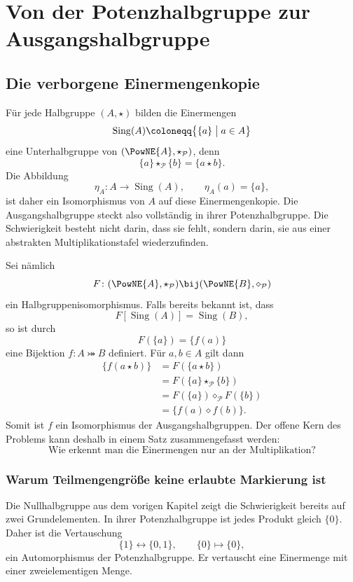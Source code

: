 \documentclass[main.tex]{subfiles}
\begin{document}
\chapter{Von der Potenzhalbgruppe zur Ausgangshalbgruppe}

\section{Die verborgene Einermengenkopie}

Für jede Halbgruppe \((A,\star)\) bilden die Einermengen
\[
  \operatorname{Sing}(A)
  \coloneqq
  \bigl\{\{a\}\bigm|a\in A\bigr\}
\]
eine Unterhalbgruppe von \((\PowNE{A},\star_{\mathcal P})\), denn
\[
  \{a\}\star_{\mathcal P}\{b\}=\{a\star b\}.
\]
Die Abbildung
\[
  \eta_A\colon A\to\operatorname{Sing}(A),
  \qquad
  \eta_A(a)=\{a\},
\]
ist daher ein Isomorphismus von \(A\) auf diese Einermengenkopie.  Die
Ausgangshalbgruppe steckt also vollständig in ihrer Potenzhalbgruppe.  Die
Schwierigkeit besteht nicht darin, dass sie fehlt, sondern darin, sie aus
einer abstrakten Multiplikationstafel wiederzufinden.

Sei nämlich
\[
  F\colon
  (\PowNE{A},\star_{\mathcal P})
  \bij
  (\PowNE{B},\diamond_{\mathcal P})
\]
ein Halbgruppenisomorphismus.  Falls bereits bekannt ist, dass
\[
  F[\operatorname{Sing}(A)]=\operatorname{Sing}(B),
\]
so ist durch
\[
  F(\{a\})=\{f(a)\}
\]
eine Bijektion \(f\colon A\bij B\) definiert.  Für \(a,b\in A\) gilt dann
\[
\begin{aligned}
  \{f(a\star b)\}
  &=F(\{a\star b\})\\
  &=F(\{a\}\star_{\mathcal P}\{b\})\\
  &=F(\{a\})\diamond_{\mathcal P}F(\{b\})\\
  &=\{f(a)\diamond f(b)\}.
\end{aligned}
\]
Somit ist \(f\) ein Isomorphismus der Ausgangshalbgruppen.  Der offene Kern
des Problems kann deshalb in einem Satz zusammengefasst werden:
\[
  \boxed{\text{Wie erkennt man die Einermengen nur an der Multiplikation?}}
\]

\subsection{Warum Teilmengengröße keine erlaubte Markierung ist}

Die Nullhalbgruppe aus dem vorigen Kapitel zeigt die Schwierigkeit bereits
auf zwei Grundelementen.  In ihrer Potenzhalbgruppe ist jedes Produkt gleich
\(\{0\}\).  Daher ist die Vertauschung
\[
  \{1\}\longleftrightarrow\{0,1\},
  \qquad
  \{0\}\longmapsto\{0\},
\]
ein Automorphismus der Potenzhalbgruppe.  Er vertauscht eine Einermenge mit
einer zweielementigen Menge.
\end{document}

